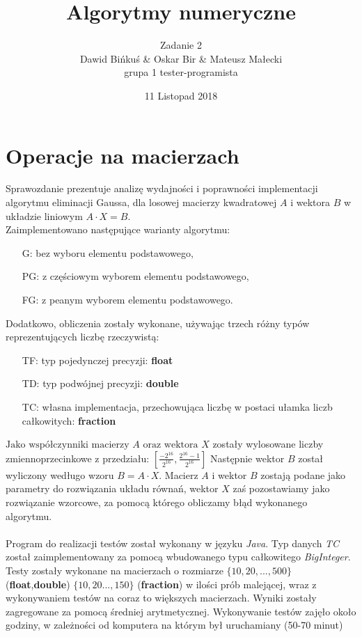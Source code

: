 \documentclass[10pt]{article}
\title{Algorytmy numeryczne}
\author{Zadanie 2 \\ Dawid Bińkuś \& Oskar Bir \& Mateusz Małecki\\grupa 1 tester-programista}
\date{11 Listopad 2018}
\begin{document}
\maketitle 

\section{Operacje na macierzach}
Sprawozdanie prezentuje analizę wydajności i poprawności implementacji algorytmu eliminacji Gaussa, dla losowej macierzy kwadratowej $A$ i wektora $B$ w układzie liniowym
$A\cdot X = B.$\\
Zaimplementowano następujące warianty algorytmu:
\begin{itemize}
	\item[G:]bez wyboru elementu podstawowego,
	\item [PG:]z częściowym wyborem elementu podstawowego,
	\item [FG:]z peanym wyborem elementu podstawowego.
\end{itemize}
Dodatkowo, obliczenia zostały wykonane, używając trzech różny typów reprezentujących liczbę rzeczywistą:
\begin{itemize}
	\item[TF:]typ pojedynczej precyzji: \textbf{float}
	\item[TD:]typ podwójnej precyzji: \textbf{double}
	\item[TC:]własna implementacja, przechowująca liczbę w postaci ułamka liczb całkowitych: \textbf{fraction}
\end{itemize}
$\text{Jako współczynniki macierzy } A \text{ oraz wektora } X$ zostały wylosowane liczby zmiennoprzecinkowe z przedziału:
$[\frac{-2^{16}}{2^{16}},\frac{2^{16}-1}{2^{16}}]$ Następnie wektor $B$ został wyliczony wedługo wzoru $B = A\cdot X$.
Macierz $A$ i wektor $B$ zostają podane jako parametry do rozwiązania układu równań, wektor $X$ zaś pozostawiamy jako rozwiązanie wzorcowe, za pomocą którego obliczamy błąd wykonanego algorytmu.\\\\
Program do realizacji testów został wykonany w języku \textit{Java}. Typ danych \textit{TC} został zaimplementowany za pomocą wbudowanego typu całkowitego \emph{BigInteger}. Testy zostały wykonane na macierzach o rozmiarze $\{10,20,...,500\}$ (\textbf{float},\textbf{double}) $\{10,20...,150\}$ (\textbf{fraction}) 
w ilości prób malejącej, wraz z wykonywaniem testów na coraz to większych macierzach. Wyniki zostały zagregowane za pomocą średniej arytmetycznej. Wykonywanie testów zajęło około godziny, w zależności od komputera na którym był uruchamiany (50-70 minut)
\end{document}
